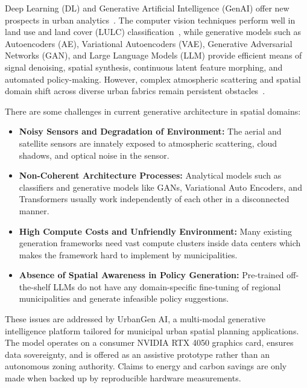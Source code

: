 \documentclass[conference]{IEEEtran}
\begin{document}
Deep Learning (DL) and Generative Artificial Intelligence (GenAI) offer new prospects in urban analytics~\cite{lecun2015deep,zhu2017deep}. The computer vision techniques perform well in land use and land cover (LULC) classification~\cite{cheng2017remote,yang2010bag,long2015fully}, while generative models such as Autoencoders (AE), Variational Autoencoders (VAE), Generative Adversarial Networks (GAN), and Large Language Models (LLM) provide efficient means of signal denoising, spatial synthesis, continuous latent feature morphing, and automated policy-making. However, complex atmospheric scattering and spatial domain shift across diverse urban fabrics remain persistent obstacles~\cite{tuia2016domain}.

There are some challenges in current generative architecture in spatial domains:
\begin{itemize}
    \item \textbf{Noisy Sensors and Degradation of Environment:} The aerial and satellite sensors are innately exposed to atmospheric scattering, cloud shadows, and optical noise in the sensor.
    \item \textbf{Non-Coherent Architecture Processes:} Analytical models such as classifiers and generative models like GANs, Variational Auto Encoders, and Transformers usually work independently of each other in a disconnected manner.
    \item \textbf{High Compute Costs and Unfriendly Environment:} Many existing generation frameworks need vast compute clusters inside data centers which makes the framework hard to implement by municipalities.
    \item \textbf{Absence of Spatial Awareness in Policy Generation:} Pre-trained off-the-shelf LLMs do not have any domain-specific fine-tuning of regional municipalities and generate infeasible policy suggestions.
\end{itemize}

These issues are addressed by UrbanGen AI, a multi-modal generative intelligence platform tailored for municipal urban spatial planning applications. The model operates on a consumer NVIDIA RTX 4050 graphics card, ensures data sovereignty, and is offered as an assistive prototype rather than an autonomous zoning authority. Claims to energy and carbon savings are only made when backed up by reproducible hardware measurements.
\end{document}
